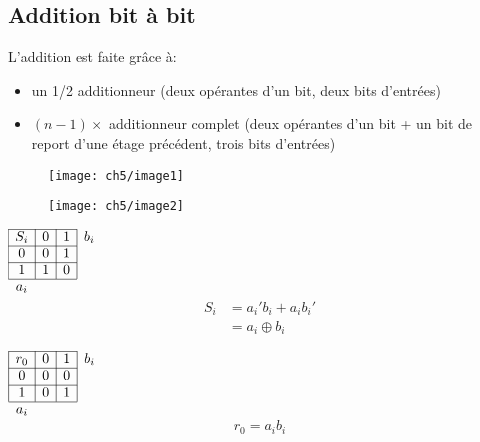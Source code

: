 \subsection{Addition bit à bit}
L'addition est faite grâce à:
\begin{itemize}
	\item un 1/2 additionneur (deux opérantes d'un bit, deux bits d'entrées)
	\item $(n-1)\times$ additionneur complet (deux opérantes d'un bit + un bit de report d'une étage précédent, trois bits d'entrées)
\end{itemize}
\begin{minipage}{.45\textwidth}
	\begin{figure}[H]
		\centering
		\texttt{[image: ch5/image1]}
	\end{figure}
\end{minipage}
\begin{minipage}{.55\textwidth}
	\begin{figure}[H]
		\centering
		\texttt{[image: ch5/image2]}
	\end{figure}
\end{minipage}
\begin{minipage}[t]{.25\textwidth}
	\begin{table}[H]
		\centering
		$\begin{array}{|c|c|c|c}
			\cline{1-3}
			S_i & 0 & 1 & b_i\\
			\cline{1-3}
			0 & 0 & 1 & \\
			\cline{1-3}
			1 & 1 & 0 & \\
			\cline{1-3}
			\multicolumn{1}{c}{a_i} & \multicolumn{1}{c}{ } & \multicolumn{1}{c}{ }		
		\end{array}$
		\begin{align*}
			S_i &=a_i'b_i+a_ib_i'\\
			&= a_i  \oplus b_i
		\end{align*} 
	\end{table}

\end{minipage}
\begin{minipage}[t]{.2\textwidth}
	\begin{table}[H]
		\centering
		$\begin{array}{|c|c|c|c}
			\cline{1-3}
			r_0 & 0 & 1 & b_i\\
			\cline{1-3}
			0 & 0 & 0 & \\
			\cline{1-3}
			1 & 0 & 1 & \\
			\cline{1-3}
			\multicolumn{1}{c}{a_i} & \multicolumn{1}{c}{ } & \multicolumn{1}{c}{ }		
		\end{array}$
		\begin{equation*}
			r_0 = a_ib_i
		\end{equation*} 
	\end{table}
\end{minipage}
